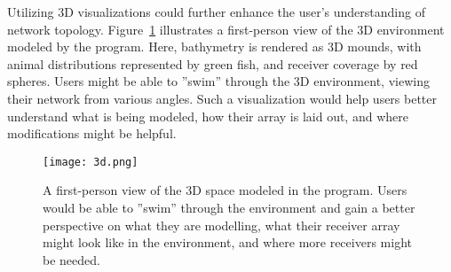 Utilizing 3D visualizations could further enhance the user's understanding of network topology.  Figure~\ref{3d} illustrates a first-person view of the 3D environment modeled by the program.  Here, bathymetry is rendered as 3D mounds, with animal distributions represented by green fish, and receiver coverage by red spheres.  Users might be able to ''swim'' through the 3D environment, viewing their network from various angles.  Such a visualization would help users better understand what is being modeled, how their array is laid out, and where modifications might be helpful.

\begin{figure}[ht]
	\texttt{[image: 3d.png]}
	\caption{A first-person view of the 3D space modeled in the program.  Users would be able to ''swim'' through the environment and gain a better perspective on what they are modelling, what their receiver array might look like in the environment, and where more receivers might be needed.\label{3d}}
\end{figure}
